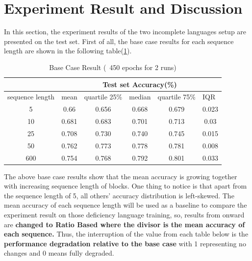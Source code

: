 \documentclass[12pt]{article}
\begin{document}
\newpage
\section{Experiment Result and Discussion} 
In this section, the experiment results of the two incomplete languages setup are presented on the test set. First of all, the base case results  for each sequence length are shown in the following table(\ref{tab:basecaseResult}).

\begin{table}[!h]
\begin{center}
\begin{tabular}{c|ccccc|}
\cline{2-5}
\multicolumn{1}{l|}{}                 & \multicolumn{5}{c|}{Test set Accuracy(\%)}                                                                                         \\ \hline
\multicolumn{1}{|c|}{sequence length} & \multicolumn{1}{c|}{mean}  & \multicolumn{1}{l|}{quartile 25\%} & \multicolumn{1}{l|}{median} & \multicolumn{1}{l|}{quartile 75\%} & \multicolumn{1}{l|}{IQR} \\ \hline
\multicolumn{1}{|c|}{5}               & \multicolumn{1}{c|}{0.66}  & \multicolumn{1}{c|}{0.656}         & \multicolumn{1}{c|}{0.668}  & \multicolumn{1}{c|}{0.679} & 0.023                            \\ \hline
\multicolumn{1}{|c|}{10}              & \multicolumn{1}{c|}{0.681} & \multicolumn{1}{c|}{0.683}         & \multicolumn{1}{c|}{0.701}  & \multicolumn{1}{c|}{0.713} & 0.03                             \\ \hline
\multicolumn{1}{|c|}{25}              & \multicolumn{1}{c|}{0.708} & \multicolumn{1}{c|}{0.730}         & \multicolumn{1}{c|}{0.740}  & \multicolumn{1}{c|}{0.745} & 0.015                            \\ \hline
\multicolumn{1}{|c|}{50}              & \multicolumn{1}{c|}{0.762} & \multicolumn{1}{c|}{0.773}         & \multicolumn{1}{c|}{0.778}  & \multicolumn{1}{c|}{0.781}  & 0.008                            \\ \hline
\multicolumn{1}{|c|}{600}             & \multicolumn{1}{c|}{0.754} & \multicolumn{1}{c|}{0.768}         & \multicolumn{1}{c|}{0.792}  & \multicolumn{1}{c|}{0.801}  &0.033                           \\ \hline
\end{tabular}
\caption{Base Case Result (~450 epochs for 2 runs)}
\label{tab:basecaseResult}
\end{center}
\end{table}
The above base case results show that the mean accuracy is growing together with increasing sequence length of blocks. One thing to notice is that apart from the sequence length of 5, all others' accuracy distribution is left-skewed. The mean accuracy of each sequence length will be used as a baseline to compare the experiment result on those deficiency language training, so, results from onward are \textbf{changed to Ratio Based where the divisor is the mean accuracy of each sequence.} Thus, the interruption of the value from each table below is the \textbf{performance degradation relative to the base case} with 1 representing no changes and 0 means fully degraded.
\end{document}
